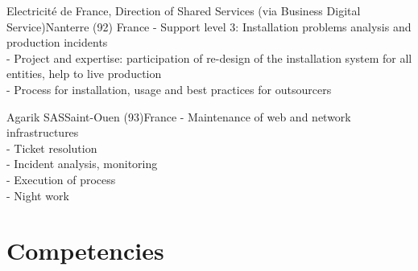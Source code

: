 \documentclass[10pt,a4paper]{moderncv}
\begin{document}
{Electricité de France, Direction of Shared Services (via Business Digital Service)}{Nanterre (92)}
{France}
{
- Support level 3: Installation problems analysis and production incidents\\
- Project and expertise: participation of re-design of the installation system for all entities, help to live production\\
- Process for installation, usage and best practices for outsourcers\\
\newline{}
}

{Agarik SAS}{Saint-Ouen (93)}{France}
{
- Maintenance of web and network infrastructures\\
- Ticket resolution\\
- Incident analysis, monitoring\\
- Execution of process\\
- Night work\\
\newline{}
}

\section{Competencies}
\end{document}
